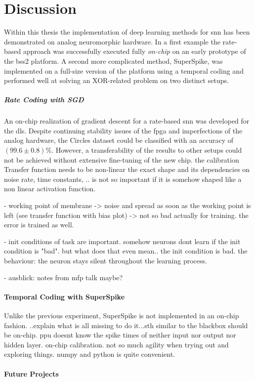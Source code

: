 \chapter{Discussion}
Within this thesis the implementation of deep learning methods for \gls{snn} has been demonstrated on analog neuromorphic hardware. In a first example the rate-based approach was successfully executed fully \emph{on-chip} on an early prototype of the \acrfull{bss2} platform. A second more complicated method, SuperSpike, was implemented on a full-size version of the platform using a temporal coding and performed well at solving  an XOR-related problem on two distinct setups.

\paragraph{Rate Coding with SGD} An on-chip realization of gradient descent for a rate-based \gls{snn} was developed for the \gls{dls}. Despite continuing stability issues of the \gls{fpga} and imperfections of the analog hardware, the Circles dataset could be classified with an accuracy of $(99.6 \pm 0.8) \%$. However, a transferability of the results to other setups could not be achieved without extensive fine-tuning of the new chip.  the calibration Transfer function needs to be non-linear the exact shape and its dependencies on noise rate, time constants, .. is not so important if it is somehow shaped like a non linear activation function.

- working point of membrane -> noise and spread as soon as the working point is left (see transfer function with bias plot) -> not so bad actually for training. the error is trained as well. 

- init conditions of task are important. somehow neurons dont learn if the init condition is "bad". but what does that even  mean.. the init condition is bad. the behaviour: the neuron stays silent throughout the learning process. 

- ausblick: notes from mfp talk maybe?
\subsubsection{Temporal Coding with SuperSpike}
Unlike the previous experiment, SuperSpike is not implemented in an on-chip fashion. ..explain what is all missing to do it...sth similar to the blackbox should be on-chip. ppu doesnt know the spike times of neither input nor output nor hidden layer. on-chip calibration. not so much agility when trying out and exploring things. numpy and python is quite convenient.
\subsubsection*{Future Projects}
\label{futureprojects}

